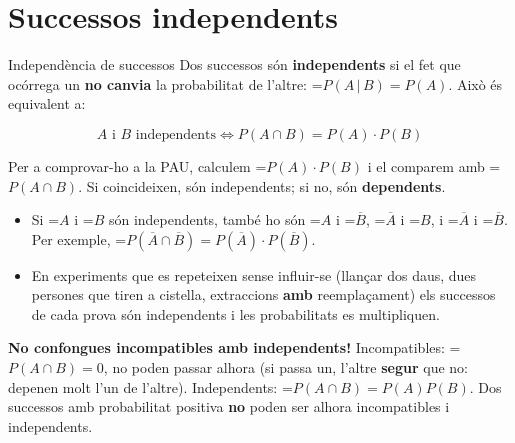 \documentclass[11pt,a4paper]{article}
\newcommand{\fmm}[1]{\setbox0=\hbox{$#1$}\ifdim\wd0>\linewidth\[#1\]\else\mbox{\box0}\fi}
\newcommand{\fmuline}[1]{\textbf{\color{fmaccent}#1}}
\begin{document}
  
\section{Successos independents}\hypertarget{sec8}{}

  

  
\begin{fmdef}{Independència de successos}
Dos successos són \textbf{independents} si el fet que ocórrega un \textbf{no canvia} la probabilitat de l'altre: \fmm{P(A\,|\,B)=P(A)}. Això és equivalent a:

      
\[A \text{ i } B \text{ independents}\iff P(A\cap B)=P(A)\cdot P(B)\]

      

Per a comprovar-ho a la PAU, calculem \fmm{P(A)\cdot P(B)} i el comparem amb \fmm{P(A\cap B)}. Si coincideixen, són independents; si no, són \textbf{dependents}.

      
\begin{itemize}
\item Si \fmm{A} i \fmm{B} són independents, també ho són \fmm{A} i \fmm{\overline{B}}, \fmm{\overline{A}} i \fmm{B}, i \fmm{\overline{A}} i \fmm{\overline{B}}. Per exemple, \fmm{P(\overline{A}\cap\overline{B})=P(\overline{A})\cdot P(\overline{B})}.
\item En experiments que es repeteixen sense influir-se (llançar dos daus, dues persones que tiren a cistella, extraccions \textbf{amb} reemplaçament) els successos de cada prova són independents i les probabilitats es multipliquen.
\end{itemize}

      
\begin{fmnote}\fmuline{No confongues incompatibles amb independents!} Incompatibles: \fmm{P(A\cap B)=0}, no poden passar alhora (si passa un, l'altre \textbf{segur} que no: depenen molt l'un de l'altre). Independents: \fmm{P(A\cap B)=P(A)P(B)}. Dos successos amb probabilitat positiva \textbf{no} poden ser alhora incompatibles i independents.\end{fmnote}
\end{fmdef}
\end{document}
